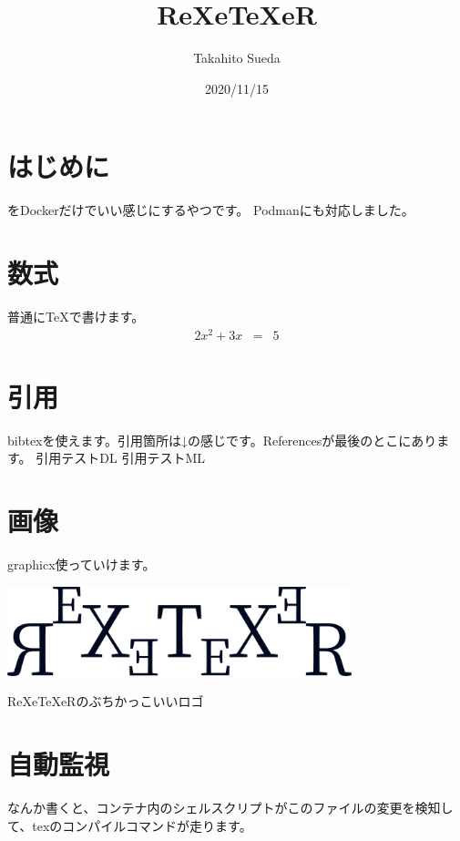 \documentclass[a4paper, xelatex]{bxjsarticle}
\begin{document}
  \title{ReXeTeXeR}
  \author{Takahito Sueda}
  \date{2020/11/15}
  \maketitle

  \section{はじめに}
  \XeTeX をDockerだけでいい感じにするやつです。
  Podmanにも対応しました。

  \section{数式}
  普通に{\TeX}で書けます。
  \begin{eqnarray}
    2x^2 + 3x & = & 5
  \end{eqnarray}

  \section{引用}
  bibtexを使えます。引用箇所は↓の感じです。Referencesが最後のとこにあります。
  引用テストDL\cite{lecun2015deep}
  引用テストML\cite{michie1994machine}

  \section{画像}
  graphicx使っていけます。
  \begin{center}
    \includegraphics[width=10cm]{img/logo.png}

    ReXeTeXeRのぶちかっこいいロゴ
  \end{center}

  \section{自動監視}
  なんか書くと、コンテナ内のシェルスクリプトがこのファイルの変更を検知して、texのコンパイルコマンドが走ります。

  
  
\end{document}
